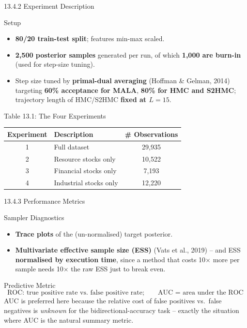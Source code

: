 \documentclass[aspectratio=169,10pt]{beamer}
\begin{document}
\begin{frame}{13.4.2 \; Experiment Description}
  \begin{block}{Setup}
    \begin{itemize}
      \item \textbf{80/20 train-test split}; features min-max scaled.
      \item \textbf{2{,}500 posterior samples} generated per run, of which
            \textbf{1{,}000 are burn-in} (used for step-size tuning).
      \item Step size tuned by \textbf{primal-dual averaging} (Hoffman \&
            Gelman, 2014) targeting \textbf{60\% acceptance for MALA},
            \textbf{80\% for HMC and S2HMC}; trajectory length of HMC/S2HMC
            \textbf{fixed at $L=15$}.
    \end{itemize}
  \end{block}
  \begin{block}{Table 13.1: The Four Experiments}
    \begin{center}
    \begin{tabular}{clc}
      \toprule
      Experiment & Description & \# Observations\\
      \midrule
      1 & Full dataset             & 29{,}935\\
      2 & Resource stocks only     & 10{,}522\\
      3 & Financial stocks only    & 7{,}193\\
      4 & Industrial stocks only   & 12{,}220\\
      \bottomrule
    \end{tabular}
    \end{center}
  \end{block}
\end{frame}

\begin{frame}{13.4.3 \; Performance Metrics}
  \begin{block}{Sampler Diagnostics}
    \begin{itemize}
      \item \textbf{Trace plots} of the (un-normalised) target posterior.
      \item \textbf{Multivariate effective sample size (ESS)} (Vats et al.,
            2019) -- and ESS \textbf{normalised by execution time}, since a
            method that costs 10$\times$ more per sample needs 10$\times$
            the raw ESS just to break even.
    \end{itemize}
  \end{block}
  \begin{block}{Predictive Metric}
    \[
      \text{ROC: true positive rate vs.\ false positive rate}; \qquad
      \text{AUC = area under the ROC}
    \]
    AUC is preferred here because the relative cost of false positives vs.\
    false negatives is \emph{unknown} for the bidirectional-accuracy task --
    exactly the situation where AUC is the natural summary metric.
  \end{block}
\end{frame}
\end{document}
